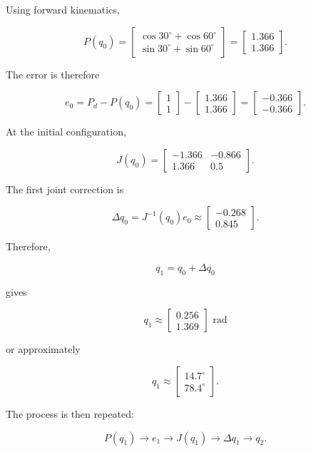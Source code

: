 \documentclass{article}
\begin{document}
Using forward kinematics,

\[
P(q_0)
=
\begin{bmatrix}
\cos30^\circ+\cos60^\circ\\
\sin30^\circ+\sin60^\circ
\end{bmatrix}
=
\begin{bmatrix}
1.366\\
1.366
\end{bmatrix}.
\]

The error is therefore

\[
e_0
=
P_d-P(q_0)
=
\begin{bmatrix}
1\\
1
\end{bmatrix}
-
\begin{bmatrix}
1.366\\
1.366
\end{bmatrix}
=
\begin{bmatrix}
-0.366\\
-0.366
\end{bmatrix}.
\]

At the initial configuration,

\[
J(q_0)
=
\begin{bmatrix}
-1.366 & -0.866\\
1.366 & 0.5
\end{bmatrix}.
\]

The first joint correction is

\[
\Delta q_0
=
J^{-1}(q_0)e_0
\approx
\begin{bmatrix}
-0.268\\
0.845
\end{bmatrix}.
\]

Therefore,

\[
q_1
=
q_0+\Delta q_0
\]

gives

\[
q_1
\approx
\begin{bmatrix}
0.256\\
1.369
\end{bmatrix}
\text{ rad}
\]

or approximately

\[
q_1
\approx
\begin{bmatrix}
14.7^\circ\\
78.4^\circ
\end{bmatrix}.
\]

The process is then repeated:

\[
P(q_1)
\rightarrow
e_1
\rightarrow
J(q_1)
\rightarrow
\Delta q_1
\rightarrow
q_2.
\]
\end{document}
